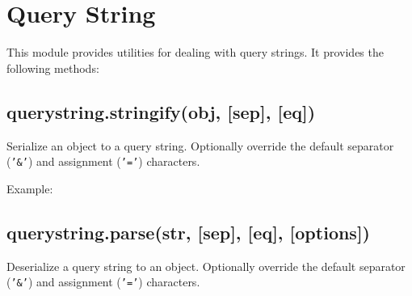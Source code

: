\section{Query String}\label{query-string}

\begin{Shaded}
\begin{Highlighting}[]
 
\end{Highlighting}
\end{Shaded}

This module provides utilities for dealing with query strings. It
provides the following methods:

\subsection{querystring.stringify(obj, {[}sep{]},
{[}eq{]})}\label{querystring.stringifyobj-sep-eq}

Serialize an object to a query string. Optionally override the default
separator (\texttt{'\&'}) and assignment (\texttt{'='}) characters.

Example:

\begin{Shaded}
\begin{Highlighting}[]
\NormalTok{(\{ }\NormalTok{: }\NormalTok{, }\NormalTok{: [}\NormalTok{, }\NormalTok{], }\NormalTok{: } \NormalTok{\})}

\NormalTok{(\{}\NormalTok{: }\NormalTok{, }\NormalTok{: }\NormalTok{\}, }\NormalTok{, }\NormalTok{)}
\end{Highlighting}
\end{Shaded}

\subsection{querystring.parse(str, {[}sep{]}, {[}eq{]},
{[}options{]})}\label{querystring.parsestr-sep-eq-options}

Deserialize a query string to an object. Optionally override the default
separator (\texttt{'\&'}) and assignment (\texttt{'='}) characters.

